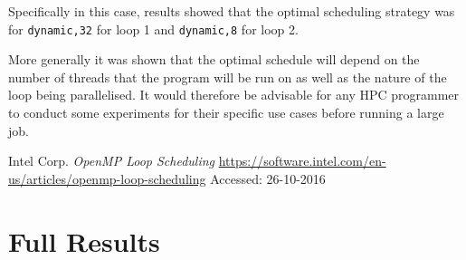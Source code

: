 \documentclass[a4paper,12pt]{article}
\begin{document}
Specifically in this case, results showed that the optimal scheduling strategy was for \verb|dynamic,32| for loop 1 and \verb|dynamic,8| for loop 2.

More generally it was shown that the optimal schedule will depend on the number of threads that the program will be run on as well as the nature of the loop being parallelised. It would therefore be advisable for any HPC programmer to conduct some experiments for their specific use cases before running a large job.




\begin{thebibliography}{}
Intel Corp.
\textit{OpenMP Loop Scheduling}
\url{https://software.intel.com/en-us/articles/openmp-loop-scheduling}
Accessed: 26-10-2016

\end{thebibliography}

\pagebreak
\pagebreak
\appendix
\section{Full Results}
\end{document}
